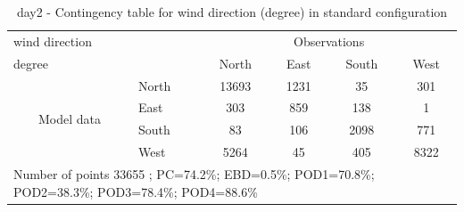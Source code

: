\begin{table}[p!]
\begin{center}
\begin{tabular}{llcccc}
\hline
{wind direction}                                       &                             &    \multicolumn{4}{c}{Observations}                 \\
{degree}                                       &                             & {North}   & {East} & {South} & {West} \\
\hline
\multicolumn{1}{c}{\multirow{4}{*}{Model data}}  & {North}                    & 13693   & 1231    & 35     & 301\\
                                                 & {East}                     & 303   & 859    & 138     & 1\\
                                                 & {South}                    & 83   & 106   & 2098    & 771\\
                                                 & {West}                     & 5264  & 45   & 405    & 8322\\
\hline 
\multicolumn{6}{l}{ Number of points        33655 ; PC=74.2\%; EBD=0.5\%; POD1=70.8\%; POD2=38.3\%; POD3=78.4\%; POD4=88.6\%}                 \\
\end{tabular}
\end{center}
\caption{day2 - Contingency table for {wind direction} (degree) in standard configuration}
\label{tab:contingencywdBEF:day2}
\end{table}
